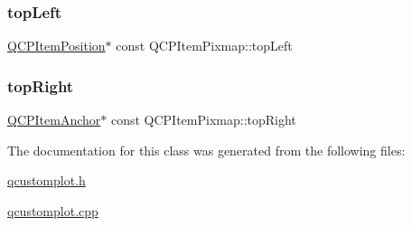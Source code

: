 \mbox{\label{class_q_c_p_item_pixmap_a43c281ef6ad46f3cf04f365289abe51a}} 
\subsubsection{\texorpdfstring{top\+Left}{topLeft}}
{\footnotesize\ttfamily \hyperlink{class_q_c_p_item_position}{Q\+C\+P\+Item\+Position}$\ast$ const Q\+C\+P\+Item\+Pixmap\+::top\+Left}

\mbox{\label{class_q_c_p_item_pixmap_a72eabd0010be41a4ec1b22aa983d2aa1}} 
\subsubsection{\texorpdfstring{top\+Right}{topRight}}
{\footnotesize\ttfamily \hyperlink{class_q_c_p_item_anchor}{Q\+C\+P\+Item\+Anchor}$\ast$ const Q\+C\+P\+Item\+Pixmap\+::top\+Right}



The documentation for this class was generated from the following files\+:\begin{DoxyCompactItemize}
\item 
\hyperlink{qcustomplot_8h}{qcustomplot.\+h}\item 
\hyperlink{qcustomplot_8cpp}{qcustomplot.\+cpp}\end{DoxyCompactItemize}
